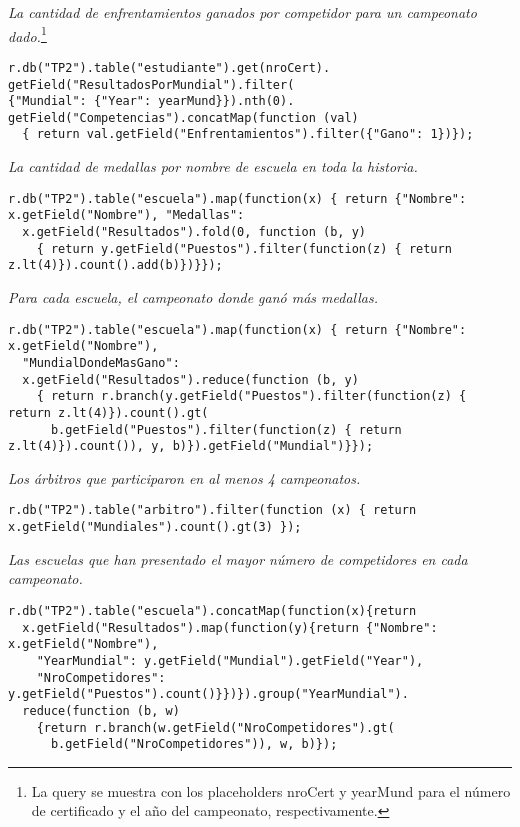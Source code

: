 
\emph{La cantidad de enfrentamientos ganados por competidor para un campeonato dado.}\footnote{La query 
se muestra con los placeholders nroCert y yearMund para el número de certificado y el año del campeonato, 
respectivamente.}
\begin{lstlisting}[language=rethinkDBnoSQL]
r.db("TP2").table("estudiante").get(nroCert).
getField("ResultadosPorMundial").filter(
{"Mundial": {"Year": yearMund}}).nth(0).
getField("Competencias").concatMap(function (val) 
  { return val.getField("Enfrentamientos").filter({"Gano": 1})});
\end{lstlisting}

\emph{La cantidad de medallas por nombre de escuela en toda la historia.}
\begin{lstlisting}[language=rethinkDBnoSQL]
r.db("TP2").table("escuela").map(function(x) { return {"Nombre": x.getField("Nombre"), "Medallas":
  x.getField("Resultados").fold(0, function (b, y) 
    { return y.getField("Puestos").filter(function(z) { return z.lt(4)}).count().add(b)})}});
\end{lstlisting}

\emph{Para cada escuela, el campeonato donde ganó más medallas.}
\begin{lstlisting}[language=rethinkDBnoSQL]
r.db("TP2").table("escuela").map(function(x) { return {"Nombre": x.getField("Nombre"), 
  "MundialDondeMasGano":
  x.getField("Resultados").reduce(function (b, y) 
    { return r.branch(y.getField("Puestos").filter(function(z) { return z.lt(4)}).count().gt(
      b.getField("Puestos").filter(function(z) { return z.lt(4)}).count()), y, b)}).getField("Mundial")}});
\end{lstlisting}

\emph{Los árbitros que participaron en al menos 4 campeonatos.}
\begin{lstlisting}[language=rethinkDBnoSQL]
r.db("TP2").table("arbitro").filter(function (x) { return x.getField("Mundiales").count().gt(3) });
\end{lstlisting}

\emph{Las escuelas que han presentado el mayor número de competidores en cada campeonato.}
\begin{lstlisting}[language=rethinkDBnoSQL]
r.db("TP2").table("escuela").concatMap(function(x){return
  x.getField("Resultados").map(function(y){return {"Nombre": x.getField("Nombre"),
    "YearMundial": y.getField("Mundial").getField("Year"), 
    "NroCompetidores": y.getField("Puestos").count()}})}).group("YearMundial").
  reduce(function (b, w) 
    {return r.branch(w.getField("NroCompetidores").gt(
      b.getField("NroCompetidores")), w, b)});
\end{lstlisting}

